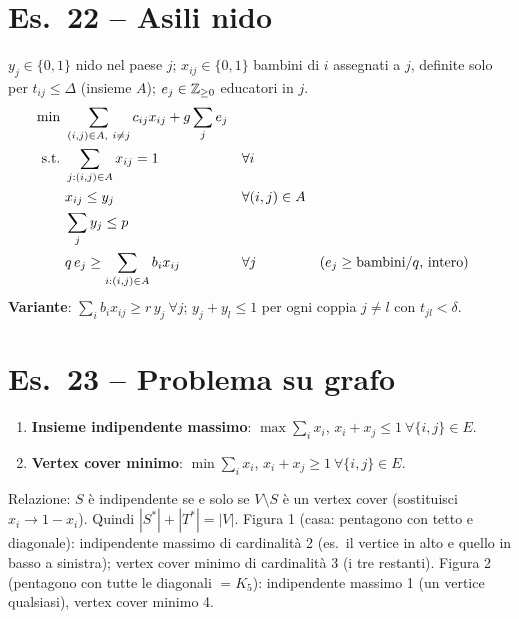 \section*{Es.\ 22 -- Asili nido}
$y_j\in\{0,1\}$ nido nel paese $j$; $x_{ij}\in\{0,1\}$ bambini di $i$ assegnati a $j$, definite solo per $t_{ij}\le\Delta$ (insieme $A$); $e_j\in\mathbb{Z}_{\ge0}$ educatori in $j$.
\begin{align*}
\min\ & \sum_{(i,j)\in A,\ i\ne j}c_{ij}x_{ij}+g\sum_je_j\\
\text{s.t.}\ & \sum_{j:(i,j)\in A}x_{ij}=1 && \forall i\\
& x_{ij}\le y_j && \forall(i,j)\in A\\
& \sum_jy_j\le p\\
& q\,e_j\ge\sum_{i:(i,j)\in A}b_ix_{ij} && \forall j &&(e_j\ge \text{bambini}/q\text{, intero})
\end{align*}
\textbf{Variante}: $\sum_ib_ix_{ij}\ge r\,y_j\ \forall j$; $y_j+y_l\le1$ per ogni coppia $j\neq l$ con $t_{jl}<\delta$.

\section*{Es.\ 23 -- Problema su grafo}
\begin{enumerate}[nosep]
\item \textbf{Insieme indipendente massimo}: $\max\sum_ix_i$, $x_i+x_j\le1\ \forall\{i,j\}\in E$.
\item \textbf{Vertex cover minimo}: $\min\sum_ix_i$, $x_i+x_j\ge1\ \forall\{i,j\}\in E$.
\end{enumerate}
Relazione: $S$ è indipendente se e solo se $V\setminus S$ è un vertex cover (sostituisci $x_i\to1-x_i$). Quindi $|S^*|+|T^*|=|V|$.
Figura 1 (casa: pentagono con tetto e diagonale): indipendente massimo di cardinalità 2 (es.\ il vertice in alto e quello in basso a sinistra); vertex cover minimo di cardinalità 3 (i tre restanti). Figura 2 (pentagono con tutte le diagonali $=K_5$): indipendente massimo 1 (un vertice qualsiasi), vertex cover minimo 4.
